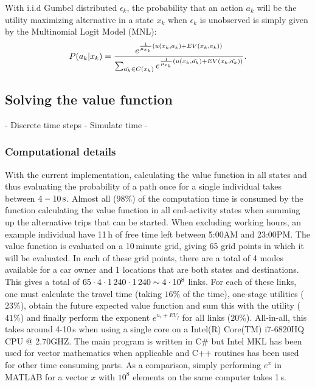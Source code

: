 With i.i.d Gumbel distributed $\epsilon_k$, the probability that an action $a_k$ will be the utility maximizing alternative in a state $x_k$ when $\epsilon_{k}$ is unobserved is simply given by the Multinomial Logit Model (MNL): 
\newcommand{\akt}{\tilde{a_k}}
\begin{equation} \label{eq:pcond}
P(a_k|x_k) = \frac{e^{\frac{1}{\mu_{x_k}}\left(\avgu(x_k,a_k) + \eutil(x_k,a_k)\right)}}{\sum_{\akt \in C(x_k)}e^{\frac{1}{\mu_{x_k}}\left(\avgu(x_k,\akt) + \eutil(x_k,\akt)\right)}}.
\end{equation}


\subsection{Solving the value function}
- Discrete time steps
- Simulate time
- 


\subsubsection{Computational details}
\label{seq:computationTime}

With the current implementation, calculating the value function in all states and thus evaluating the probability of a path once for a single individual takes between $4-10\, \mathrm{s}$. Almost all ($98\%$) of the computation time is consumed by the function calculating the value function in all end-activity states when summing up the alternative trips that can be started. When excluding working hours, an example individual have 11\,h of free time left between 5:00AM and 23:00PM. The value function is evaluated on a 10\,minute grid, giving 65 grid points in which it will be evaluated. In each of these grid points, there are a total of 4 modes available for a car owner and 1 locations that are both states and destinations. This gives a total of $65 \cdot 4 \cdot 1\, 240 \cdot 1\, 240 \sim 4 \cdot 10^8$ links. For each of these links, one must calculate the travel time (taking $16\%$ of the time), one-stage utilities ($23\%$), obtain the future expected value function and sum this with the utility ($41\%$) and finally perform the exponent $e^{u_i + EV_j}$ for all links ($20\%$). All-in-all, this takes around 4-10\,s when using a single core on a Intel(R) Core(TM) i7-6820HQ CPU @ 2.70GHZ. The main program is written in C\# but Intel MKL has been used for vector mathematics when applicable and C++ routines has been used for other time consuming parts. As a comparison, simply performing $e^x$ in MATLAB for a vector $x$ with $10^8$ elements on the same computer takes 1\,s. 

